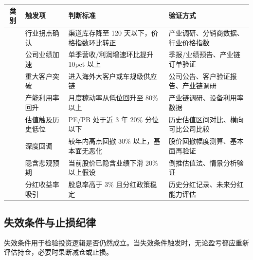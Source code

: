 \begin{exhibitbox}[表 11-7：买入触发条件清单]
\centering
\small
\begin{tabularx}{\textwidth}{c X L{4.5cm} L{5.5cm}}
\toprule
\textbf{类别} & \textbf{触发项} & \textbf{判断标准} & \textbf{验证方式} \\
\midrule
{} & 行业拐点确认 & 渠道库存降至 120 天以下，价格指数环比转正 & 产业调研、分销商数据、行业价格指数 \\
& 公司业绩加速 & 单季营收/利润增速环比提升 10pct 以上 & 季报/业绩预告、产业链订单验证 \\
& 重大客户突破 & 进入海外大客户或车规级供应链 & 公司公告、客户验证报告、产业链调研 \\
& 产能利用率回升 & 月度稼动率从低位回升至 80\% 以上 & 产业链调研、设备利用率数据 \\
\midrule
{} & 估值触及历史低位 & PE/PB 处于近 3 年 20\% 分位以下 & 历史估值区间对比、横向可比公司比较 \\
& 深度回调 & 较年内高点回撤 30\% 以上，基本面无恶化 & 股价回撤幅度测算、基本面再验证 \\
& 隐含悲观预期 & 当前股价已隐含业绩下滑 20\% 以上假设 & 倒推估值法、情景分析验证 \\
& 分红收益率吸引 & 股息率高于 3\% 且分红政策稳定 & 历史分红记录、未来分红能力评估 \\
\bottomrule
\end{tabularx}
\end{exhibitbox}

\subsection{失效条件与止损纪律}

失效条件用于检验投资逻辑是否仍然成立。当失效条件触发时，无论盈亏都应重新评估持仓，必要时果断减仓或止损。

